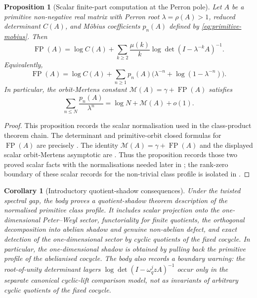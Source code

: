 \documentclass[11pt,a4paper]{amsart}
\theoremstyle{plain}
\newtheorem{proposition}[theorem]{Proposition}
\newtheorem{corollary}[theorem]{Corollary}
\theoremstyle{definition}
\theoremstyle{remark}
\DeclareMathOperator{\FP}{FP}
\begin{document}
\begin{proposition}[Scalar finite-part computation at the
  Perron pole]
  \label{prop:intro-scalar-finite-part-computation}
  \label{thm:intro-finite-part}
  Let \(A\) be a primitive non-negative real matrix with Perron root
  \(\lambda=\rho(A)>1\), reduced determinant \(C(A)\), and M\"obius
  coefficients \(p_n(A)\) defined by \eqref{eq:primitive-mobius}. Then
  \[
    \FP(A)
    =\log C(A)
      +\sum_{k\ge 2}\frac{\mu(k)}{k}
        \log\det(I-\lambda^{-k}A)^{-1}.
  \]
  Equivalently,
  \[
    \FP(A)
    =\log C(A)
      +\sum_{n\ge 1}p_n(A)
        \bigl(\lambda^{-n}+\log(1-\lambda^{-n})\bigr).
  \]
  In particular, the orbit-Mertens constant
  \(\mathcal M(A)=\gamma+\FP(A)\) satisfies
  \[
    \sum_{n\le N}\frac{p_n(A)}{\lambda^n}
    =\log N+\mathcal M(A)+o(1).
  \]
\end{proposition}

\begin{proof}
  This proposition records the scalar normalisation used in the class-product
  theorem chain.
  The determinant and primitive-orbit closed formulas for \(\FP(A)\) are
  precisely . The identity
  \(\mathcal M(A)=\gamma+\FP(A)\) and the displayed scalar orbit-Mertens
  asymptotic are . Thus the
  proposition records those two proved scalar facts with the normalisations
  needed later in
; the rank-zero boundary of
  these scalar records for the non-trivial class profile is isolated in
  .
\end{proof}


\begin{corollary}[Introductory quotient-shadow consequences]
  \label{thm:intro-quotient-shadow}
  Under the twisted spectral gap, the body proves a quotient-shadow theorem
description of the normalised primitive class profile.  It includes scalar
  projection onto the one-dimensional Peter--Weyl sector, functoriality for
  finite quotients, the orthogonal decomposition into abelian shadow and
  genuine non-abelian defect, and exact detection of the one-dimensional
  sector by cyclic quotients of the fixed cocycle.  In particular, the
  one-dimensional shadow is obtained by pulling back the primitive profile
  of the abelianised cocycle.  The body also records a boundary warning:
  the root-of-unity determinant layers
  \(\log\det(I-\omega_q^j zA)^{-1}\) occur only in the separate canonical
  cyclic-lift comparison model, not as invariants of arbitrary cyclic
  quotients of the fixed cocycle.
\end{corollary}
\end{document}
